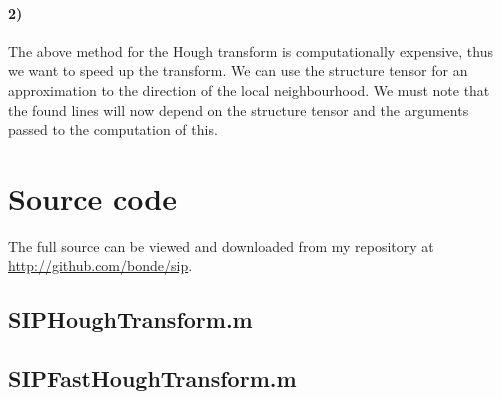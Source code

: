 \documentclass[a4paper, 10pt, final]{article}
\def\repository{\url{http://github.com/bonde/sip}}
\begin{document}
\paragraph{2)}
The above method for the Hough transform is computationally expensive,
thus we want to speed up the transform. We can use the structure tensor
for an approximation to the direction of the local neighbourhood. We
must note that the found lines will now depend on the structure tensor
and the arguments passed to the computation of this.

\clearpage




\appendix
\lstset{language=Matlab, basicstyle=\scriptsize,
    showstringspaces=false, numbers=left, stepnumber=1,
    numberstyle=\tiny, frame=none}
\section{Source code}
The full source can be viewed and downloaded from my repository at
\repository{}.

\subsection{SIPHoughTransform.m}


\subsection{SIPFastHoughTransform.m}

\end{document}
